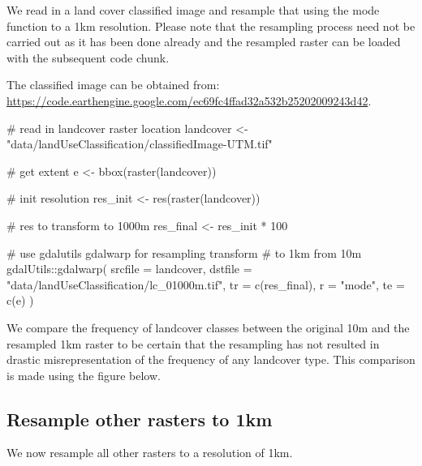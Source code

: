 \documentclass[]{article}
\newenvironment{Shaded}{}{}
\newcommand{\CommentTok}[1]{\textcolor[rgb]{0.00,0.50,0.00}{#1}}
\newcommand{\DataTypeTok}[1]{#1}
\newcommand{\DecValTok}[1]{#1}
\newcommand{\KeywordTok}[1]{\textcolor[rgb]{0.00,0.00,1.00}{#1}}
\newcommand{\NormalTok}[1]{#1}
\newcommand{\OperatorTok}[1]{#1}
\newcommand{\StringTok}[1]{\textcolor[rgb]{0.00,0.50,0.50}{#1}}
\begin{document}
We read in a land cover classified image and resample that using the mode function to a 1km resolution. Please note that the resampling process need not be carried out as it has been done already and the resampled raster can be loaded with the subsequent code chunk.

The classified image can be obtained from: \url{https://code.earthengine.google.com/ec69fc4ffad32a532b25202009243d42}.

\begin{Shaded}
\begin{Highlighting}[numbers=left,,]
\CommentTok{# read in landcover raster location}
\NormalTok{landcover <-}\StringTok{ "data/landUseClassification/classifiedImage-UTM.tif"}

\CommentTok{# get extent}
\NormalTok{e <-}\StringTok{ }\KeywordTok{bbox}\NormalTok{(}\KeywordTok{raster}\NormalTok{(landcover))}

\CommentTok{# init resolution}
\NormalTok{res_init <-}\StringTok{ }\KeywordTok{res}\NormalTok{(}\KeywordTok{raster}\NormalTok{(landcover))}

\CommentTok{# res to transform to 1000m}
\NormalTok{res_final <-}\StringTok{ }\NormalTok{res_init }\OperatorTok{*}\StringTok{ }\DecValTok{100}

\CommentTok{# use gdalutils gdalwarp for resampling transform}
\CommentTok{# to 1km from 10m}
\NormalTok{gdalUtils}\OperatorTok{::}\KeywordTok{gdalwarp}\NormalTok{(}
  \DataTypeTok{srcfile =}\NormalTok{ landcover,}
  \DataTypeTok{dstfile =} \StringTok{"data/landUseClassification/lc_01000m.tif"}\NormalTok{,}
  \DataTypeTok{tr =} \KeywordTok{c}\NormalTok{(res_final), }\DataTypeTok{r =} \StringTok{"mode"}\NormalTok{, }\DataTypeTok{te =} \KeywordTok{c}\NormalTok{(e)}
\NormalTok{)}
\end{Highlighting}
\end{Shaded}

We compare the frequency of landcover classes between the original 10m and the resampled 1km raster to be certain that the resampling has not resulted in drastic misrepresentation of the frequency of any landcover type. This comparison is made using the figure below.

\hypertarget{resample-other-rasters-to-1km}{%
\subsection{Resample other rasters to 1km}\label{resample-other-rasters-to-1km}}

We now resample all other rasters to a resolution of 1km.
\end{document}
